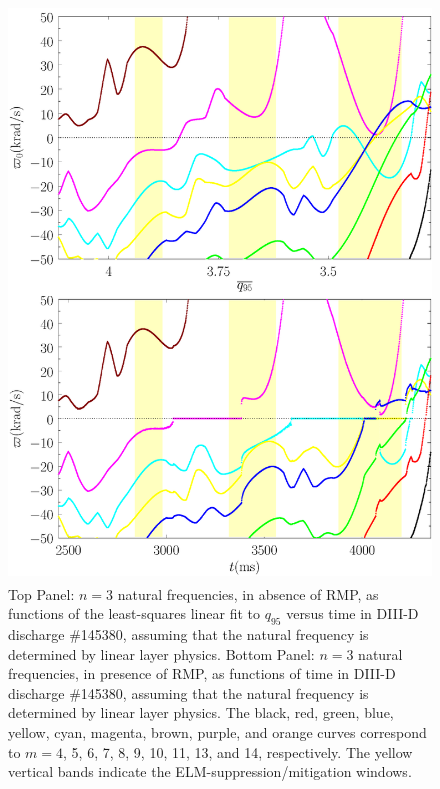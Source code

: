 \documentclass[12pt,prb,aps]{revtex4-1}
\begin{document}
\begin{figure}
\includegraphics[height=6in]{fig11.pdf}
\caption{Top Panel: $n=3$ natural frequencies, in absence of RMP, as functions of the least-squares linear fit to $q_{95}$ versus time
in   DIII-D discharge \#145380, assuming that the natural frequency is determined by linear layer physics.
Bottom Panel:  $n=3$ natural frequencies, in presence of RMP, as functions of time
in   DIII-D discharge \#145380, assuming that the natural frequency is determined by linear layer physics. The black, red, green, blue, yellow, cyan, magenta,  brown, 
purple, and orange curves correspond to $m=4$, 5, 6, 7, 8, 9, 10,  11, 13, and 14, respectively. The yellow vertical bands indicate the ELM-suppression/mitigation windows.} \label{fig11}
\end{figure}
\end{document}
